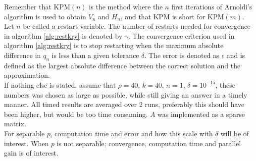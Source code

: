 Remember that KPM$(n)$ is the method where the $n$ first iterations of Arnoldi's algorithm is used to obtain $V_n$ and $H_n$, and that KPM is short for KPM$(m)$. Let $n$ be called a restart variable. The number of restarts needed for convergence in algorithm \ref{alg:restkry} is denoted by $\gamma$. The convergence criterion used in algorithm \ref{alg:restkry} is to stop restarting when the maximum absolute difference in $q_n$ is less than a given tolerance $\delta$. The error is denoted as $\epsilon$ and is defined as the largest absolute difference between the correct solution and the approximation. \\

If nothing else is stated, assume that $\rho =40$, $k = 40$, $n = 1$, $\delta = 10^{-15}$, these numbers was chosen as large as possible, while still giving an answer in a timely manner. All timed results are averaged over 2 runs, preferably this should have been higher, but would be too time consuming. $A$ was implemented as a sparse matrix.\\
 
For separable $p$, computation time and error and how this scale with $\delta$ will be of interest. When $p$ is not separable; convergence, computation time and parallel gain is of interest. \\



